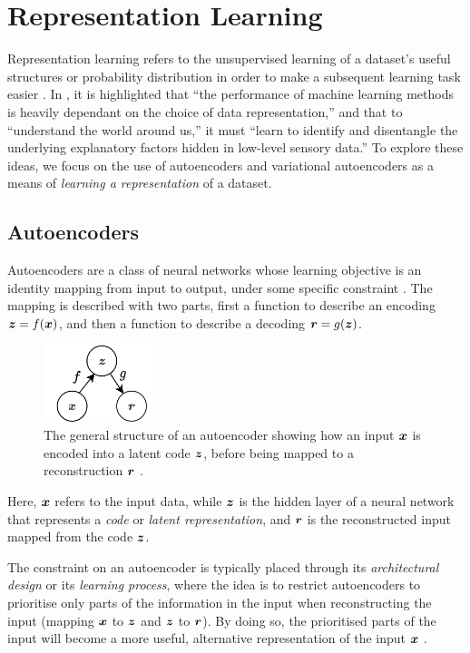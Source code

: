 \section{Representation Learning}
\label{sec:2_representation_learning}
Representation learning refers to the unsupervised learning of a dataset's useful structures or probability distribution in order to make a subsequent learning task easier \cite{DeepLearningBook}.
In \cite{RepresentationLearning2012}, it is highlighted that ``the performance of machine learning methods is heavily dependant on the choice of data representation,'' and that to ``understand the world around us,'' it must ``learn to identify and disentangle the underlying explanatory factors hidden in low-level sensory data.''
To explore these ideas, we focus on the use of autoencoders and variational autoencoders as a means of \textit{learning a representation} of a dataset.


\subsection{Autoencoders}
\label{subsec:2_autoencoders}
Autoencoders are a class of neural networks whose learning objective is an identity mapping from input to output, under some specific constraint \cite{NLPCA_autoencoder1991}. 
The mapping is described with two parts, first a function to describe an encoding $\boldsymbol{z} = f(\boldsymbol{x})$, and then a function to describe a decoding $\boldsymbol{r} = g(\boldsymbol{z})$.
\begin{figure}[hbt]
    \centering
    \includegraphics[width=0.3\textwidth]{figures/2_/2_general_autoencoder.png}
    \captionsetup{justification=centering}
    \caption{The general structure of an autoencoder showing how an input $\boldsymbol{x}$ is encoded into a latent code $\boldsymbol{z}$, before being mapped to a reconstruction $\boldsymbol{r}$ \cite{DeepLearningBook}.}
    \label{fig:2_general_autoencoder}
\end{figure}
Here, $\boldsymbol{x}$ refers to the input data, while $\boldsymbol{z}$ is the hidden layer of a neural network that represents a \textit{code} or \textit{latent representation}, and $\boldsymbol{r}$ is the reconstructed input mapped from the code $\boldsymbol{z}$.

The constraint on an autoencoder is typically placed through its \textit{architectural design} or its \textit{learning process}, where the idea is to restrict autoencoders to prioritise only parts of the information in the input when reconstructing the input (mapping $\boldsymbol{x}$ to $\boldsymbol{z}$ and $\boldsymbol{z}$ to $\boldsymbol{r}$). By doing so, the prioritised parts of the input will become a more useful, alternative representation of the input $\boldsymbol{x}$ \cite{DeepLearningBook}. 

